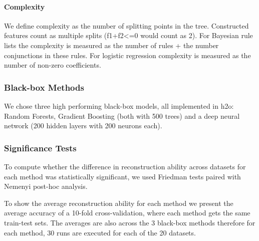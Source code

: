 \paragraph{Complexity}
We define complexity as the number of splitting points in the tree. Constructed features count as multiple splits (f1+f2<=0 would count as 2). For Bayesian rule lists the complexity is measured as the number of rules + the number conjunctions in these rules. For logistic regression complexity is measured as the number of non-zero coefficients.
\subsubsection{Black-box Methods}
We chose three high performing black-box models, all implemented in h2o: Random Forests, Gradient Boosting (both with 500 trees) and a deep neural network (200 hidden layers with 200 neurons each).

\subsubsection{Significance Tests}
To compute whether the difference in reconstruction ability across datasets for each method was statistically significant, we used Friedman tests paired with Nemenyi post-hoc analysis. 

To show the average reconstruction ability for each method we present the average accuracy of a 10-fold cross-validation, where each method gets the same train-test sets. The averages are also across the 3 black-box methods therefore for each method, 30 runs are executed for each of the 20 datasets.
